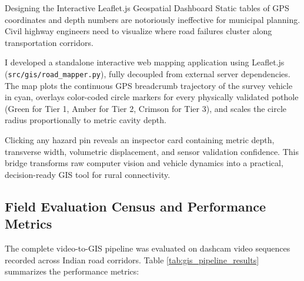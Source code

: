 \begin{designreflection}{Designing the Interactive Leaflet.js Geospatial Dashboard}
Static tables of GPS coordinates and depth numbers are notoriously ineffective for municipal planning. Civil highway engineers need to visualize where road failures cluster along transportation corridors. 

I developed a standalone interactive web mapping application using Leaflet.js (\texttt{src/gis/road\_mapper.py}), fully decoupled from external server dependencies. The map plots the continuous GPS breadcrumb trajectory of the survey vehicle in cyan, overlays color-coded circle markers for every physically validated pothole (Green for Tier 1, Amber for Tier 2, Crimson for Tier 3), and scales the circle radius proportionally to metric cavity depth. 

Clicking any hazard pin reveals an inspector card containing metric depth, transverse width, volumetric displacement, and sensor validation confidence. This bridge transforms raw computer vision and vehicle dynamics into a practical, decision-ready GIS tool for rural connectivity.
\end{designreflection}

\subsection{Field Evaluation Census and Performance Metrics}
The complete video-to-GIS pipeline was evaluated on dashcam video sequences recorded across Indian road corridors. Table \ref{tab:gis_pipeline_results} summarizes the performance metrics:

